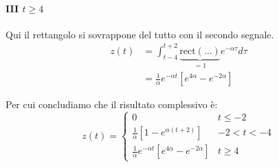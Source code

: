 \begin{exa}
    \paragraph{III $t\ge 4$} Qui il rettangolo si sovrappone del tutto con il secondo segnale.
    \[
        \begin{aligned}
            z(t) &= \int_{t-4}^{t+2} \underbrace{ \text{rect}(\ldots ) }_{=1} e^{-\alpha \tau }d\tau \\ 
                 &=\frac{1}{\alpha}e^{-\alpha t}[e^{4 \alpha} - e^{-2 \alpha}] 
        \end{aligned}
    \] 

    Per cui concludiamo che il risultato complessivo è:
    \[
        z(t) = \begin{cases}
            0 & t \le  -2 \\ 
            \frac{1}{\alpha}\left[ 1 - e^{\alpha(t+2)} \right] & -2 < t < -4 \\ 
            \frac{1}{\alpha}e^{-\alpha t}[e^{4 \alpha} - e^{-2 \alpha}] & t\ge 4
        \end{cases}
    \] 
\end{exa}

